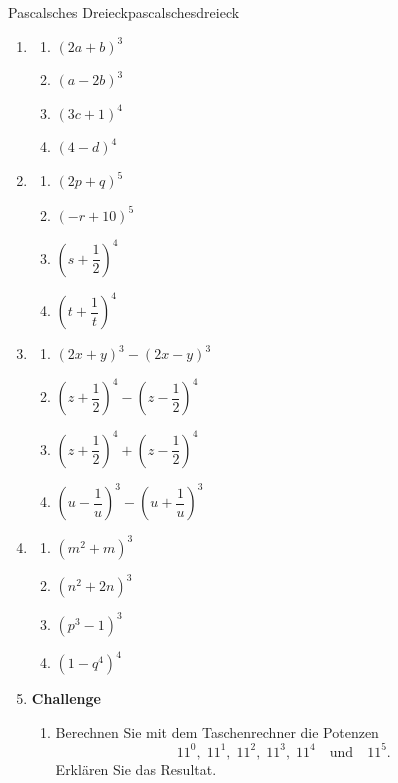 \clearpage
\begin{ueb}
    {Pascalsches Dreieck}{pascalschesdreieck}
    \begin{enumerate}
        \item
              \begin{enumerate}
                  \item \((2a+b)^3\)
                  \item \((a-2b)^3\)
                  \item \((3c+1)^4\)
                  \item \((4-d)^4\)
              \end{enumerate}

        \item
              \begin{enumerate}
                  \item \((2p+q)^5\)
                  \item \((-r+10)^5\)
                  \item \(\left(s+\dfrac{1}{2}\right)^4\)
                  \item \(\left(t+\dfrac{1}{t}\right)^4\)
              \end{enumerate}

        \item
              \begin{enumerate}
                  \item \((2x+y)^3-(2x-y)^3\)
                  \item \(\left(z+\dfrac{1}{2}\right)^4-\left(z-\dfrac{1}{2}\right)^4\)
                  \item \(\left(z+\dfrac{1}{2}\right)^4+\left(z-\dfrac{1}{2}\right)^4\)
                  \item \(\left(u-\dfrac{1}{u}\right)^3-\left(u+\dfrac{1}{u}\right)^3\)
              \end{enumerate}

        \item
              \begin{enumerate}
                  \item \((m^2+m)^3\)
                  \item \((n^2+2n)^3\)
                  \item \((p^3-1)^3\)
                  \item \((1-q^4)^4\)
              \end{enumerate}

        \item \textbf{Challenge}
              \begin{enumerate}
                  \item Berechnen Sie mit dem Taschenrechner die Potenzen
                        \[
                            11^0,\;11^1,\;11^2,\;11^3,\;11^4
                            \quad\text{und}\quad 11^5.
                        \]
                        Erklären Sie das Resultat.


\end{enumerate}
\end{enumerate}
\end{ueb}
